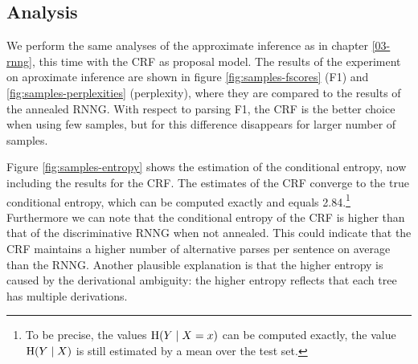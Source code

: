   \subsection{Analysis}

    We perform the same analyses of the approximate inference as in chapter \ref{03-rnng}, this time with the CRF as proposal model. The results of the experiment on aproximate inference are shown in figure \ref{fig:samples-fscores} (F1) and \ref{fig:samples-perplexities} (perplexity), where they are compared to the results of the annealed RNNG. With respect to parsing F1, the CRF is the better choice when using few samples, but for this difference disappears for larger number of samples.

    Figure \ref{fig:samples-entropy} shows the estimation of the conditional entropy, now including the results for the CRF. The estimates of the CRF converge to the true conditional entropy, which can be computed exactly and equals 2.84.\footnote{To be precise, the values $\operatorname{H}(Y \mid X = x)$ can be computed exactly, the value $\operatorname{H}(Y \mid X)$ is still estimated by a mean over the test set.} Furthermore we can note that the conditional entropy of the CRF is higher than that of the discriminative RNNG when not annealed. This could indicate that the CRF maintains a higher number of alternative parses per sentence on average than the RNNG. Another plausible explanation is that the higher entropy is caused by the derivational ambiguity: the higher entropy reflects that each tree has multiple derivations.


